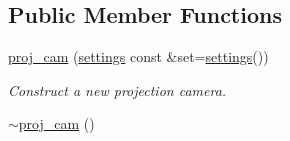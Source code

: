 \subsection*{Public Member Functions}
\begin{DoxyCompactItemize}
\item 
\hyperlink{classgfx_1_1proj__cam_af0e3ae63279b365f1cfe9e2da5d9defc}{proj\-\_\-cam} (\hyperlink{classgfx_1_1proj__cam_1_1settings}{settings} const \&set=\hyperlink{classgfx_1_1proj__cam_1_1settings}{settings}())
\begin{DoxyCompactList}\small\item\em Construct a new projection camera. \end{DoxyCompactList}\item 
\hypertarget{classgfx_1_1proj__cam_ad82cad064ed31c060800f31783ef15f5}{\hyperlink{classgfx_1_1proj__cam_ad82cad064ed31c060800f31783ef15f5}{$\sim$proj\-\_\-cam} ()}\label{classgfx_1_1proj__cam_ad82cad064ed31c060800f31783ef15f5}


\end{DoxyCompactItemize}

